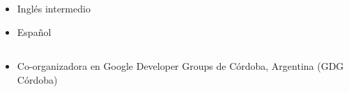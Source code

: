 \documentclass[%
               doublesided,
               paper=a4,
               fontsize=10pt
              ]{my-resume}
\begin{document}
{    
\vspace{1.0em}
\subsection{    }

 
\begin{itemize}
\item 	Inglés intermedio
\item 	Español
\end{itemize}
 
\vspace{1.0em}
\subsection{  }
 
\begin{itemize}
\item Co-organizadora en Google Developer Groups de Córdoba, Argentina
(GDG Córdoba)
\end{itemize}

}
\end{document}
